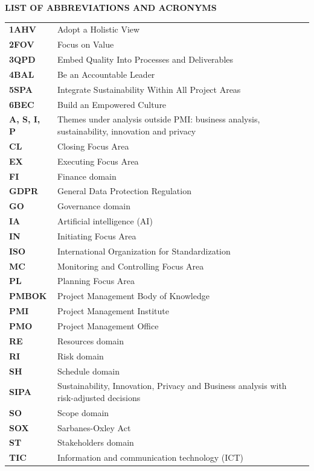 \documentclass[12pt,a4paper,article,oneside,brazil,english]{abntex2}
\begin{document}
\begingroup
\SingleSpacing
\begin{center}\textbf{LIST OF ABBREVIATIONS AND ACRONYMS}\end{center}
\small
\begin{longtable}{@{}>{\raggedright\arraybackslash}p{2.6cm}>{\raggedright\arraybackslash}p{\dimexpr\linewidth-2.6cm-2\tabcolsep\relax}@{}}
\textbf{1AHV} & Adopt a Holistic View\\[2pt]
\textbf{2FOV} & Focus on Value\\[2pt]
\textbf{3QPD} & Embed Quality Into Processes and Deliverables\\[2pt]
\textbf{4BAL} & Be an Accountable Leader\\[2pt]
\textbf{5SPA} & Integrate Sustainability Within All Project Areas\\[2pt]
\textbf{6BEC} & Build an Empowered Culture\\[2pt]
\textbf{A, S, I, P} & Themes under analysis outside PMI: business analysis, sustainability, innovation and privacy\\[2pt]
\textbf{CL} & Closing Focus Area\\[2pt]
\textbf{EX} & Executing Focus Area\\[2pt]
\textbf{FI} & Finance domain\\[2pt]
\textbf{GDPR} & General Data Protection Regulation\\[2pt]
\textbf{GO} & Governance domain\\[2pt]
\textbf{IA} & Artificial intelligence (AI)\\[2pt]
\textbf{IN} & Initiating Focus Area\\[2pt]
\textbf{ISO} & International Organization for Standardization\\[2pt]
\textbf{MC} & Monitoring and Controlling Focus Area\\[2pt]
\textbf{PL} & Planning Focus Area\\[2pt]
\textbf{PMBOK} & Project Management Body of Knowledge\\[2pt]
\textbf{PMI} & Project Management Institute\\[2pt]
\textbf{PMO} & Project Management Office\\[2pt]
\textbf{RE} & Resources domain\\[2pt]
\textbf{RI} & Risk domain\\[2pt]
\textbf{SH} & Schedule domain\\[2pt]
\textbf{SIPA} & Sustainability, Innovation, Privacy and Business analysis with risk-adjusted decisions\\[2pt]
\textbf{SO} & Scope domain\\[2pt]
\textbf{SOX} & Sarbanes-Oxley Act\\[2pt]
\textbf{ST} & Stakeholders domain\\[2pt]
\textbf{TIC} & Information and communication technology (ICT)\\[2pt]
\end{longtable}
\endgroup
\clearpage
\end{document}
